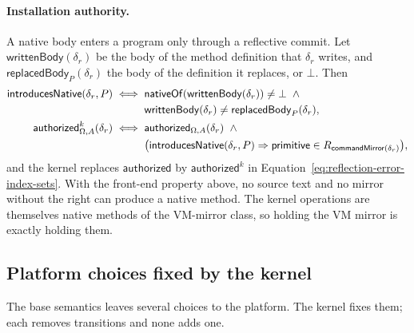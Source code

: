 \paragraph{Installation authority.}
A native body enters a program only through a reflective commit.  Let
$\mathsf{writtenBody}(\delta_r)$ be the body of the method definition that
$\delta_r$ writes, and $\mathsf{replacedBody}_P(\delta_r)$ the body of the
definition it replaces, or $\bot$.  Then
\begin{equation}\label{eq:native-install-right}
\begin{aligned}
 \mathsf{introducesNative}(\delta_r,P)
 \;\Longleftrightarrow\;{}
 &\mathsf{nativeOf}(\mathsf{writtenBody}(\delta_r))\ne\bot\ \land{}\\
 &\mathsf{writtenBody}(\delta_r)\ne\mathsf{replacedBody}_P(\delta_r),\\
 \mathsf{authorized}^{k}_{\Omega,A}(\delta_r)
 \;\Longleftrightarrow\;{}
 &\mathsf{authorized}_{\Omega,A}(\delta_r)\ \land{}\\
 &\bigl(\mathsf{introducesNative}(\delta_r,P)\Rightarrow
   \mathsf{primitive}\in R_{\mathsf{commandMirror}(\delta_r)}\bigr),
\end{aligned}
\end{equation}
and the kernel replaces $\mathsf{authorized}$ by $\mathsf{authorized}^k$ in
Equation~\eqref{eq:reflection-error-index-sets}.  With the front-end property
above, no source text and no mirror without the  right can
produce a native method.  The kernel operations are themselves native methods
of the VM-mirror class, so holding the VM mirror is exactly holding them.

\subsection{Platform choices fixed by the kernel}

The base semantics leaves several choices to the platform.  The kernel fixes
them; each removes transitions and none adds one.

